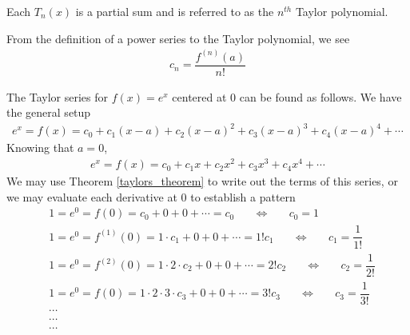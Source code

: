 \begin{note}
Each $T_{n}(x)$ is a partial sum and is referred to as the $n^{th}$ Taylor polynomial.
\end{note}

\begin{note}
From the definition of a power series to the Taylor polynomial, we see
\begin{align*}
    c_{n} = \dfrac{f^{(n)}(a)}{n!}
\end{align*}
\end{note}

\begin{example}
The Taylor series for $f(x) = e^{x}$ centered at $0$ can be found as follows. We have the general setup
\begin{align*}
    e^{x} = f(x) = c_{0} + c_{1} (x - a) + c_{2} (x - a)^{2} + c_{3} (x - a)^{3} + c_{4} (x - a)^{4} + \cdots 
\end{align*}
Knowing that $a = 0$,
\begin{align*}
    e^{x} = f(x) = c_{0} + c_{1}x + c_{2}x^{2} + c_{3}x^{3} + c_{4}x^{4} + \cdots 
\end{align*}
We may use Theorem \ref{taylors_theorem} to write out the terms of this series, or we may evaluate each derivative at $0$ to establish a pattern
\begin{align*}
    &1 = e^{0} = f(0) = c_{0} + 0 + 0 + \cdots = c_{0} \hspace{20pt} \Longleftrightarrow \hspace{20pt} c_{0} = 1\\[2ex]
    &1 = e^{0} = f^{(1)}(0) = 1 \cdot c_{1} + 0 + 0 + \cdots = 1!c_{1} \hspace{20pt} \Longleftrightarrow \hspace{20pt} c_{1} = \dfrac{1}{1!}\\[2ex]
    &1 = e^{0} = f^{(2)}(0) = 1 \cdot 2 \cdot c_{2} + 0 + 0 + \cdots = 2!c_{2} \hspace{20pt} \Longleftrightarrow \hspace{20pt} c_{2} = \dfrac{1}{2!}\\[2ex]
    &1 = e^{0} = f(0) = 1 \cdot 2 \cdot 3 \cdot c_{3} + 0 + 0 + \cdots = 3!c_{3} \hspace{20pt} \Longleftrightarrow \hspace{20pt} c_{3} = \dfrac{1}{3!}\\[1ex]
    &\cdots\\[1ex]
    &\cdots\\[1ex]
    &\cdots
\end{align*}

\end{example}
